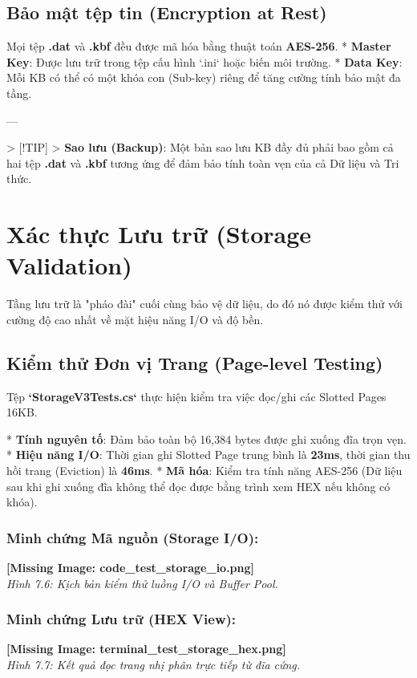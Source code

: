 \subsection{Bảo mật tệp tin (Encryption at Rest)}

Mọi tệp \textbf{.dat} và \textbf{.kbf} đều được mã hóa bằng thuật toán \textbf{AES-256}.
*   \textbf{Master Key}: Được lưu trữ trong tệp cấu hình `.ini` hoặc biến môi trường.
*   \textbf{Data Key}: Mỗi KB có thể có một khóa con (Sub-key) riêng để tăng cường tính bảo mật đa tầng.

---

> [!TIP]
> \textbf{Sao lưu (Backup)}: Một bản sao lưu KB đầy đủ phải bao gồm cả hai tệp \textbf{.dat} và \textbf{.kbf} tương ứng để đảm bảo tính toàn vẹn của cả Dữ liệu và Tri thức.

\section{Xác thực Lưu trữ (Storage Validation)}

Tầng lưu trữ là "pháo đài" cuối cùng bảo vệ dữ liệu, do đó nó được kiểm thử với cường độ cao nhất về mặt hiệu năng I/O và độ bền.

\subsection{Kiểm thử Đơn vị Trang (Page-level Testing)}

Tệp \textbf{`StorageV3Tests.cs`} thực hiện kiểm tra việc đọc/ghi các Slotted Pages 16KB.

*   \textbf{Tính nguyên tố}: Đảm bảo toàn bộ 16,384 bytes được ghi xuống đĩa trọn vẹn.
*   \textbf{Hiệu năng I/O}: Thời gian ghi Slotted Page trung bình là \textbf{23ms}, thời gian thu hồi trang (Eviction) là \textbf{46ms}.
*   \textbf{Mã hóa}: Kiểm tra tính năng AES-256 (Dữ liệu sau khi ghi xuống đĩa không thể đọc được bằng trình xem HEX nếu không có khóa).

\subsubsection{Minh chứng Mã nguồn (Storage I/O):}
\textbf{[Missing Image: code_test_storage_io.png]}\\ \textit{Hình 7.6: Kịch bản kiểm thử luồng I/O và Buffer Pool.}

\subsubsection{Minh chứng Lưu trữ (HEX View):}
\textbf{[Missing Image: terminal_test_storage_hex.png]}\\ \textit{Hình 7.7: Kết quả đọc trang nhị phân trực tiếp từ đĩa cứng.}

